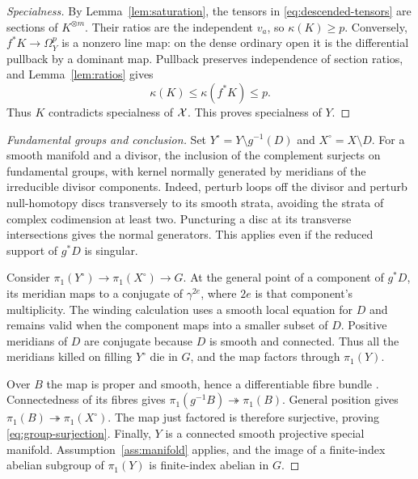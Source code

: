 \begin{proof}[Specialness]
By Lemma~\ref{lem:saturation}, the tensors in \eqref{eq:descended-tensors} are sections of $K^{\otimes m}$. Their ratios are the independent $v_a$, so $\kappa(K)\ge p$. Conversely, $f^*K\to\Omega_Y^p$ is a nonzero line map: on the dense ordinary open it is the differential pullback by a dominant map. Pullback preserves independence of section ratios, and Lemma~\ref{lem:ratios} gives
\[
 \kappa(K)\le\kappa(f^*K)\le p.
\]
Thus $K$ contradicts specialness of $\mathcal X$. This proves specialness of $Y$.
\end{proof}

\begin{proof}[Fundamental groups and conclusion]
Set $Y^\circ=Y\setminus g^{-1}(D)$ and $X^\circ=X\setminus D$. For a smooth manifold and a divisor, the inclusion of the complement surjects on fundamental groups, with kernel normally generated by meridians of the irreducible divisor components. Indeed, perturb loops off the divisor and perturb null-homotopy discs transversely to its smooth strata, avoiding the strata of complex codimension at least two. Puncturing a disc at its transverse intersections gives the normal generators. This applies even if the reduced support of $g^*D$ is singular.

Consider $\pi_1(Y^\circ)\to\pi_1(X^\circ)\to G$. At the general point of a component of $g^*D$, its meridian maps to a conjugate of $\gamma^{2e}$, where $2e$ is that component's multiplicity. The winding calculation uses a smooth local equation for $D$ and remains valid when the component maps into a smaller subset of $D$. Positive meridians of $D$ are conjugate because $D$ is smooth and connected. Thus all the meridians killed on filling $Y^\circ$ die in $G$, and the map factors through $\pi_1(Y)$.

Over $B$ the map is proper and smooth, hence a differentiable fibre bundle \cite{Ehresmann}. Connectedness of its fibres gives $\pi_1(g^{-1}B)\twoheadrightarrow\pi_1(B)$. General position gives $\pi_1(B)\twoheadrightarrow\pi_1(X^\circ)$. The map just factored is therefore surjective, proving \eqref{eq:group-surjection}. Finally, $Y$ is a connected smooth projective special manifold. Assumption~\ref{ass:manifold} applies, and the image of a finite-index abelian subgroup of $\pi_1(Y)$ is finite-index abelian in $G$.
\end{proof}
